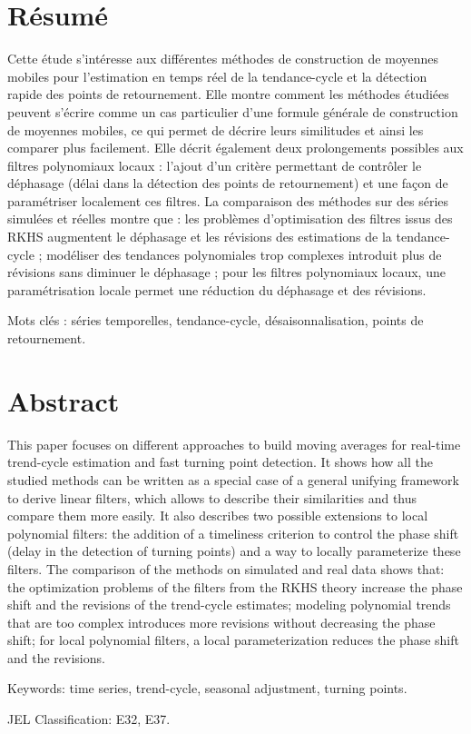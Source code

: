 \thispagestyle{fancy}

\hypertarget{ruxe9sumuxe9}{%
\section*{Résumé}\label{ruxe9sumuxe9}}

Cette étude s'intéresse aux différentes méthodes de construction de
moyennes mobiles pour l'estimation en temps réel de la tendance-cycle et
la détection rapide des points de retournement. Elle montre comment les
méthodes étudiées peuvent s'écrire comme un cas particulier d'une
formule générale de construction de moyennes mobiles, ce qui permet de
décrire leurs similitudes et ainsi les comparer plus facilement. Elle
décrit également deux prolongements possibles aux filtres polynomiaux
locaux : l'ajout d'un critère permettant de contrôler le déphasage
(délai dans la détection des points de retournement) et une façon de
paramétriser localement ces filtres. La comparaison des méthodes sur des
séries simulées et réelles montre que : les problèmes d'optimisation des
filtres issus des RKHS augmentent le déphasage et les révisions des
estimations de la tendance-cycle ; modéliser des tendances polynomiales
trop complexes introduit plus de révisions sans diminuer le déphasage ;
pour les filtres polynomiaux locaux, une paramétrisation locale permet
une réduction du déphasage et des révisions.

Mots clés : séries temporelles, tendance-cycle, désaisonnalisation,
points de retournement.

\hypertarget{abstract}{%
\section*{Abstract}\label{abstract}}

This paper focuses on different approaches to build moving averages for
real-time trend-cycle estimation and fast turning point detection. It
shows how all the studied methods can be written as a special case of a
general unifying framework to derive linear filters, which allows to
describe their similarities and thus compare them more easily. It also
describes two possible extensions to local polynomial filters: the
addition of a timeliness criterion to control the phase shift (delay in
the detection of turning points) and a way to locally parameterize these
filters. The comparison of the methods on simulated and real data shows
that: the optimization problems of the filters from the RKHS theory
increase the phase shift and the revisions of the trend-cycle estimates;
modeling polynomial trends that are too complex introduces more
revisions without decreasing the phase shift; for local polynomial
filters, a local parameterization reduces the phase shift and the
revisions.

Keywords: time series, trend-cycle, seasonal adjustment, turning points.

JEL Classification: E32, E37.

\newpage
